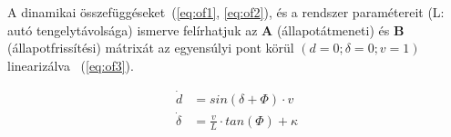A dinamikai összefüggéseket~(\ref{eq:of1}, \ref{eq:of2}), és a rendszer paramétereit (L: autó tengelytávolsága) ismerve felírhatjuk az \textbf{A} (állapotátmeneti) és \textbf{B} (állapotfrissítési) mátrixát az egyensúlyi pont körül $(d = 0; \delta = 0; v = 1)$ linearizálva ~(\ref{eq:of3}).

\begin{align} 
    \dot{d} &= sin(\delta + \Phi) \cdot v  \label{eq:of1} \\ 
    \dot{\delta} &= \frac{v}{L} \cdot tan(\Phi) + \kappa \label{eq:of2}
\end{align}


